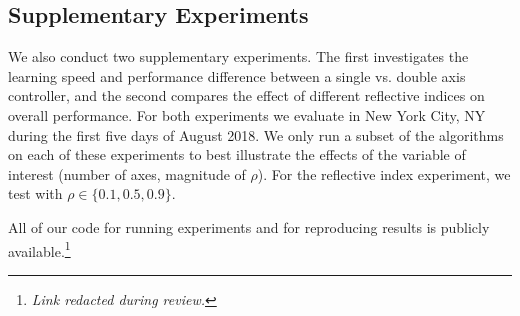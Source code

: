 \documentclass{article}
\begin{document}
{\subsection{Supplementary Experiments}
We also conduct two supplementary experiments. The first investigates the learning speed and performance difference between a single vs. double axis controller, and the second compares the effect of different reflective indices on overall performance. For both experiments we evaluate in New York City, NY during the first five days of August 2018. We only run a subset of the algorithms on each of these experiments to best illustrate the effects of the variable of interest (number of axes, magnitude of $\rho$). For the reflective index experiment, we test with $\rho \in \{0.1,0.5,0.9\}$.

All of our code for running experiments and for reproducing results is publicly available.\footnote{{\it Link redacted during review.}} %





}
\end{document}
